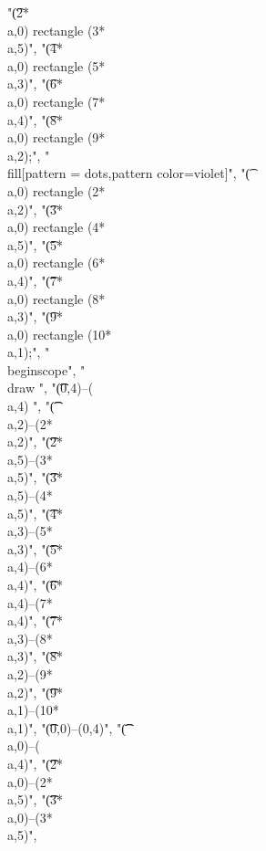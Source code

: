 "\t(2*\\a,0) rectangle (3*\\a,5)",
"\t(4*\\a,0) rectangle (5*\\a,3)",
"\t(6*\\a,0) rectangle (7*\\a,4)",
"\t(8*\\a,0) rectangle (9*\\a,2);",
"\t\\fill[pattern = dots,pattern color=violet]",
"\t(\\a,0) rectangle (2*\\a,2)",
"\t(3*\\a,0) rectangle (4*\\a,5)",
"\t(5*\\a,0) rectangle (6*\\a,4)",
"\t(7*\\a,0) rectangle (8*\\a,3)",
"\t(9*\\a,0) rectangle (10*\\a,1);",
"\t\\begin{scope}",
"\t\t\\draw ",
"\t\t(0,4)--(\\a,4) ",
"\t\t(\\a,2)--(2*\\a,2)",
"\t\t(2*\\a,5)--(3*\\a,5)",
"\t\t(3*\\a,5)--(4*\\a,5)",
"\t\t(4*\\a,3)--(5*\\a,3)",
"\t\t(5*\\a,4)--(6*\\a,4)",
"\t\t(6*\\a,4)--(7*\\a,4)",
"\t\t(7*\\a,3)--(8*\\a,3)",
"\t\t(8*\\a,2)--(9*\\a,2)",
"\t\t(9*\\a,1)--(10*\\a,1)",
"\t\t(0,0)--(0,4)",
"\t\t(\\a,0)--(\\a,4)",
"\t\t(2*\\a,0)--(2*\\a,5)",
"\t\t(3*\\a,0)--(3*\\a,5)",
